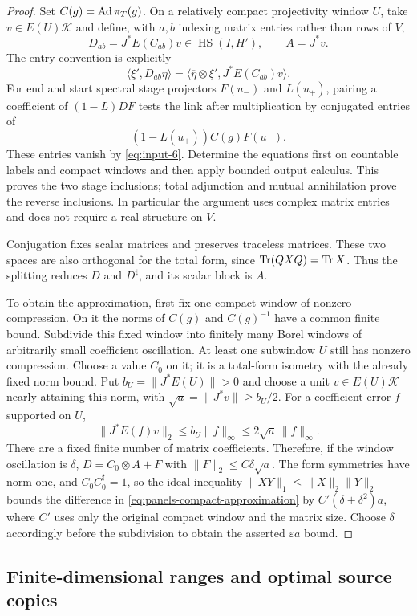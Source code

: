 \begin{proof}
Set $C(g)=\operatorname{Ad}\pi_T(g)$.  On a relatively compact projectivity window
$U$, take $v\in E(U)\mathcal K$ and define, with $a,b$ indexing matrix
entries rather than rows of $V$,
\[
 D_{ab}=J^*E(C_{ab})v\in\operatorname{HS}(I,H'),
 \qquad A=J^*v.
\]
The entry convention is explicitly
\[
 \langle\xi',D_{ab}\eta\rangle
 =\langle\overline\eta\otimes\xi',J^*E(C_{ab})v\rangle.
\]
For end and start spectral stage projectors $F(u_-)$ and $L(u_+)$,
pairing a coefficient of $(1-L)DF$ tests the link after multiplication
by conjugated entries of
\[
 (1-L(u_+))C(g)F(u_-).
\]
These entries vanish by \eqref{eq:input-6}.  Determine the equations
first on countable labels and compact windows and then apply bounded
output calculus.  This proves the two stage inclusions; total adjunction
and mutual annihilation prove the reverse inclusions.  In particular the
argument uses complex matrix entries and does not require a real
structure on $V$.

Conjugation fixes scalar matrices and preserves traceless matrices.
These two spaces are also orthogonal for the total form, since
$\operatorname{Tr}(QXQ)=\operatorname{Tr} X$.  Thus the splitting reduces $D$ and $D^\sharp$,
and its scalar block is $A$.

To obtain the approximation, first fix one compact window of nonzero
compression.  On it the norms of $C(g)$ and $C(g)^{-1}$ have a common
finite bound.  Subdivide this fixed window into finitely many Borel
windows of arbitrarily small coefficient oscillation.  At least one
subwindow $U$ still has nonzero compression.  Choose a value $C_0$ on it;
it is a total-form isometry with the already fixed norm bound.  Put
$b_U=\|J^*E(U)\|>0$ and choose a unit $v\in
E(U)\mathcal K$ nearly attaining this norm, with
$\sqrt a=\|J^*v\|\geq b_U/2$.  For a coefficient error $f$ supported
on $U$,
\[
 \|J^*E(f)v\|_2\leq b_U\|f\|_\infty
                    \leq2\sqrt a\,\|f\|_\infty.
\]
There are a fixed finite number of matrix coefficients.  Therefore, if
the window oscillation is $\delta$,
$D=C_0\otimes A+F$ with $\|F\|_2\leq C\delta\sqrt a$.
The form symmetries have norm one, and $C_0C_0^\sharp=1$, so the ideal
inequality $\|XY\|_1\leq\|X\|_2\|Y\|_2$ bounds the difference
in \eqref{eq:panels-compact-approximation} by
$C'(\delta+\delta^2)a$, where $C'$ uses only the original compact
window and the matrix size.  Choose $\delta$ accordingly before the
subdivision to obtain the asserted $\varepsilon a$ bound.
\end{proof}

\subsection{Finite-dimensional ranges and optimal source copies}

